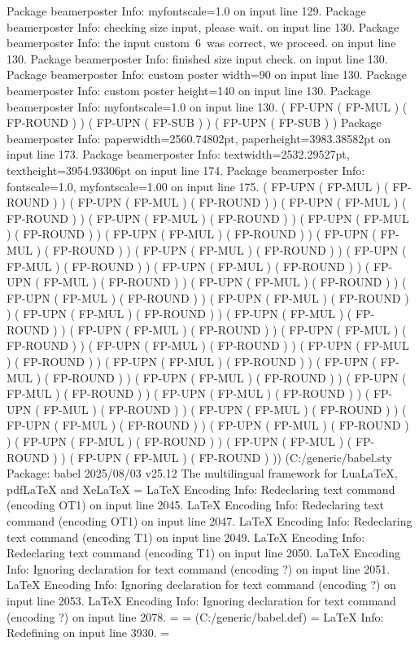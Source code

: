 Package beamerposter Info: myfontscale=1.0 on input line 129.
Package beamerposter Info: checking size input, please wait. on input line 130.
Package beamerposter Info: the input custom\ 6\ was correct, we proceed. on input line 130.
Package beamerposter Info: finished size input check. on input line 130.
Package beamerposter Info: custom poster width=90 on input line 130.
Package beamerposter Info: custom poster height=140 on input line 130.
Package beamerposter Info: myfontscale=1.0 on input line 130.
 ( FP-UPN ( FP-MUL ) ( FP-ROUND ) ) ( FP-UPN ( FP-SUB ) ) ( FP-UPN ( FP-SUB ) )
Package beamerposter Info: paperwidth=2560.74802pt, paperheight=3983.38582pt on input line 173.
Package beamerposter Info: textwidth=2532.29527pt, textheight=3954.93306pt on input line 174.
Package beamerposter Info: fontscale=1.0, myfontscale=1.00 on input line 175.
 ( FP-UPN ( FP-MUL ) ( FP-ROUND ) ) ( FP-UPN ( FP-MUL ) ( FP-ROUND ) ) ( FP-UPN ( FP-MUL ) ( FP-ROUND ) ) ( FP-UPN ( FP-MUL ) ( FP-ROUND ) ) ( FP-UPN ( FP-MUL ) ( FP-ROUND ) ) ( FP-UPN ( FP-MUL ) ( FP-ROUND ) ) ( FP-UPN ( FP-MUL ) ( FP-ROUND ) ) ( FP-UPN ( FP-MUL ) ( FP-ROUND ) ) ( FP-UPN ( FP-MUL ) ( FP-ROUND ) ) ( FP-UPN ( FP-MUL ) ( FP-ROUND ) ) ( FP-UPN ( FP-MUL ) ( FP-ROUND ) ) ( FP-UPN ( FP-MUL ) ( FP-ROUND ) ) ( FP-UPN ( FP-MUL ) ( FP-ROUND ) ) ( FP-UPN ( FP-MUL ) ( FP-ROUND ) ) ( FP-UPN ( FP-MUL ) ( FP-ROUND ) ) ( FP-UPN ( FP-MUL ) ( FP-ROUND ) ) ( FP-UPN ( FP-MUL ) ( FP-ROUND ) ) ( FP-UPN ( FP-MUL ) ( FP-ROUND ) ) ( FP-UPN ( FP-MUL ) ( FP-ROUND ) ) ( FP-UPN ( FP-MUL ) ( FP-ROUND ) ) ( FP-UPN ( FP-MUL ) ( FP-ROUND ) ) ( FP-UPN ( FP-MUL ) ( FP-ROUND ) ) ( FP-UPN ( FP-MUL ) ( FP-ROUND ) ) ( FP-UPN ( FP-MUL ) ( FP-ROUND ) ) ( FP-UPN ( FP-MUL ) ( FP-ROUND ) ) ( FP-UPN ( FP-MUL ) ( FP-ROUND ) ) ( FP-UPN ( FP-MUL ) ( FP-ROUND ) ) ( FP-UPN ( FP-MUL ) ( FP-ROUND ) ) ( FP-UPN ( FP-MUL ) ( FP-ROUND ) ) ( FP-UPN ( FP-MUL ) ( FP-ROUND ) ) ( FP-UPN ( FP-MUL ) ( FP-ROUND ) ) ( FP-UPN ( FP-MUL ) ( FP-ROUND ) )) (C:\Users\SEARS\AppData\Local\Programs\MiKTeX\tex/generic/babel\babel.sty
Package: babel 2025/08/03 v25.12 The multilingual framework for LuaLaTeX, pdfLaTeX and XeLaTeX
\babel@savecnt=
LaTeX Encoding Info:    Redeclaring text command \ij (encoding OT1) on input line 2045.
LaTeX Encoding Info:    Redeclaring text command \IJ (encoding OT1) on input line 2047.
LaTeX Encoding Info:    Redeclaring text command \ij (encoding T1) on input line 2049.
LaTeX Encoding Info:    Redeclaring text command \IJ (encoding T1) on input line 2050.
LaTeX Encoding Info:    Ignoring declaration for text command \ij (encoding ?) on input line 2051.
LaTeX Encoding Info:    Ignoring declaration for text command \IJ (encoding ?) on input line 2053.
LaTeX Encoding Info:    Ignoring declaration for text command \SS (encoding ?) on input line 2078.
\U@D=
\l@unhyphenated=
 (C:\Users\SEARS\AppData\Local\Programs\MiKTeX\tex/generic/babel\txtbabel.def)
\bbl@readstream=
LaTeX Info: Redefining \textlatin on input line 3930.
\bbl@dirlevel=

